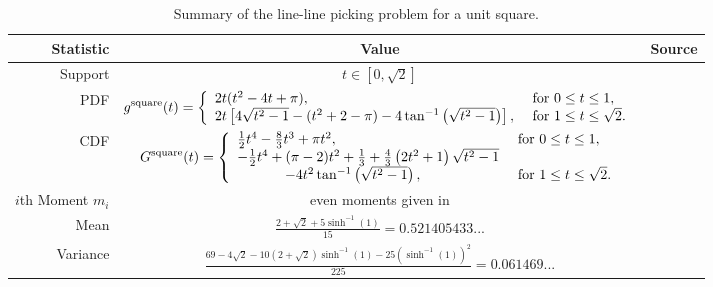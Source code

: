 \begin{table}[ht]
  \centering
  \begin{tabular}{|r|c|l|}
    \hline
    Statistic & Value & Source \\ 
    \hline
      Support            & $t \in [0, \sqrt{2}]$ & \\
      PDF                & $\displaystyle 
  g^{\rm square}(t) = \left\{ \begin{array}{ll}
      2t (t^2-4t+\pi),
               & \mbox{ for } 0 \leq t \leq 1, \\
      2t \left[4 \sqrt{t^2-1} - (t^2+2-\pi) - 4 \tan^{-1} \left(\sqrt{t^2-1} \right)\right], 
               & \mbox{ for } 1 \leq t \leq \sqrt{2} . \\ 
    \end{array} \right.
                                 $ &
                             \cite{philip:_probab_distr_distan_between_two,weisstein:_squar_line_picking} \\
      CDF                & $\displaystyle
  G^{\rm square}(t) = \left\{ \begin{array}{ll}
      \frac{1}{2} t^4 - \frac{8}{3} t^3 + \pi t^2, 
               & \mbox{ for } 0 \leq t \leq 1, \\
      -\frac{1}{2} t^4 + (\pi-2)t^2 + \frac{1}{3}
                   +\frac{4}{3} \left( 2t^2+1 \right)\sqrt{t^2-1} 
                     & \\
                   \hspace{12mm} - 4 t^2 \tan^{-1} \left(\sqrt{t^2-1} \right),
               & \mbox{ for } 1 \leq t \leq \sqrt{2} . \\ 
    \end{array} \right.
                                 $ & 
                             \cite{weisstein:_squar_line_picking} \\
      $i$th Moment $m_i$ & even moments given in\cite{weisstein:_squar_line_picking} &
                              \cite{weisstein:_squar_line_picking} \\
      Mean               & $\displaystyle \frac{2 + \sqrt{2} + 5\sinh^{-1}(1)}{15}
                             = 0.521405433...$ &
                             \cite{weisstein:_squar_line_picking,Bailey2007196} \\[1.5ex]
      Variance           & $\displaystyle \frac{69 - 4\sqrt{2} -
                             10(2+\sqrt{2}) \sinh^{-1}(1)
                             -25(\sinh^{-1}(1) )^2
                            }{225}
                             = 0.061469...$ &
                             \cite{weisstein:_squar_line_picking} \\[1.5ex]
    \hline
  \end{tabular}
  \caption{Summary of the line-line picking problem for a unit square.}
  \label{tab:summary_line}
\end{table}


